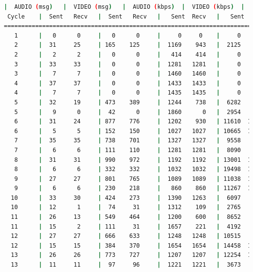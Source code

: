 \begin{lstlisting}[language=bash,basicstyle=\ttfamily\scriptsize]
          |  AUDIO (msg)   |  VIDEO (msg)   |  AUDIO (kbps)  |  VIDEO (kbps)  |   CPU (%)
 Cycle    |  Sent   Recv   |  Sent   Recv   |   Sent  Recv   |   Sent  Recv   | Program System
============================================================================================
   1      |   0      0     |   0      0     |     0     0    |     0     0    |   0      0
   2      |  31     25     | 165    125     |  1169    943   |  2125   1612   |  36     63
   2      |   2      2     |   0      0     |   414    414   |     0      0   |  44     66
   3      |  33     33     |   0      0     |  1281   1281   |     0      0   |  35     74
   3      |   7      7     |   0      0     |  1460   1460   |     0      0   |  44     72
   4      |  37     37     |   0      0     |  1433   1433   |     0      0   |  34     74
   4      |   7      7     |   0      0     |  1435   1435   |     0      0   |  37     75
   5      |  32     19     | 473    389     |  1244    738   |  6282   5163   |  27     72
   5      |   9      0     |  42      0     |  1860      0   |  2954      0   |  25     72
   6      |  31     24     | 877    776     |  1202    930   | 11610  10274   |  27     74
   6      |   5      5     | 152    150     |  1027   1027   | 10665  10524   |  25     75
   7      |  35     35     | 738    701     |  1327   1327   |  9558   9076   |  27     75
   7      |   6      6     | 111    110     |  1281   1281   |  8090   8031   |  26     75
   8      |  31     31     | 990    972     |  1192   1192   | 13001  12767   |  24     72
   8      |   6      6     | 332    332     |  1032   1032   | 19498  19498   |  26     73
   9      |  27     27     | 801    765     |  1089   1089   | 11038  10541   |  23     79
   9      |   6      6     | 230    218     |   860    860   | 11267  10669   |   8     79
  10      |  33     30     | 424    273     |  1390   1263   |  6097   3925   |  34     71
  10      |  12      1     |  74     31     |  1312    109   |  2765   1158   |  26     67
  11      |  26     13     | 549    464     |  1200    600   |  8652   7314   |  26     70
  11      |  15      2     | 111     31     |  1657    221   |  4192   1170   |  40     72
  12      |  27     27     | 666    633     |  1248   1248   | 10515   9994   |  28     75
  12      |  15     15     | 384    370     |  1654   1654   | 14458  13938   |  40     76
  13      |  26     26     | 773    727     |  1207   1207   | 12254  11524   |  25     74
  13      |  11     11     |  97     96     |  1221   1221   |  3673   3635   |  40     75

\end{lstlisting}
